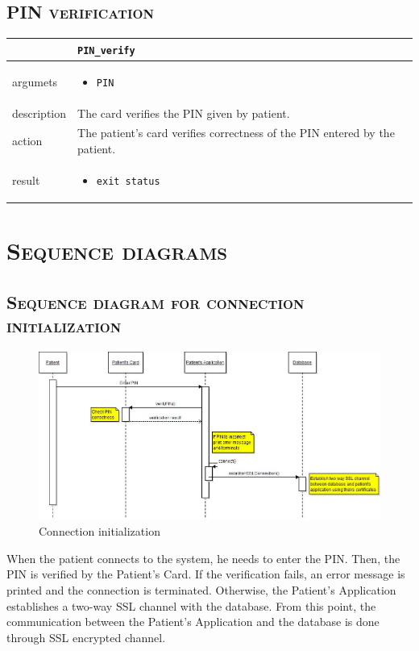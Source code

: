 \documentclass[12pt,titlepage]{article}
\begin{document}
\subsection{\textsc{PIN verification}}

\begin{tabularx}{\textwidth}{ |p{2.5cm}|X| }
	\hline
	 &  \texttt{PIN\_verify}\\
\hline	
argumets & 
\begin{itemize}
\item \texttt{PIN}
\end{itemize} \\
\hline
description & 
The card verifies the PIN given by patient.\\
\hline
action & 
The patient's card verifies correctness of the PIN entered by the patient.\\
\hline
result &
\begin{itemize}
\item \texttt{exit status}
\end{itemize}\\
\hline
\end{tabularx}


\newpage


\section{\textsc{Sequence diagrams}}

\FloatBarrier
\subsection{\textsc{Sequence diagram for connection initialization}}

\begin{figure}[!h]
\includegraphics[width=\linewidth]{initializeConnectionSequenceDiagram}
\caption{Connection initialization}	
\end{figure}
When the patient connects to the system, he needs to enter the PIN. 
Then, the PIN is verified by the Patient’s Card. 
If the verification fails, an error message is printed and the connection is terminated. 
Otherwise, the Patient’s Application establishes a two-way SSL channel with the database. 
From this point, the communication between the Patient’s Application and the database is done through SSL encrypted channel.
\end{document}
